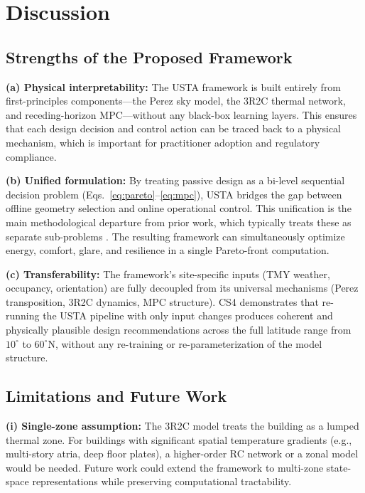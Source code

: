 \documentclass[5p,times,twocolumn]{elsarticle}
\begin{document}
\section{Discussion}
\label{sec:discussion}

\subsection{Strengths of the Proposed Framework}

\textbf{(a) Physical interpretability:} The USTA framework is built entirely from first-principles components---the Perez sky model, the 3R2C thermal network, and receding-horizon MPC---without any black-box learning layers. This ensures that each design decision and control action can be traced back to a physical mechanism, which is important for practitioner adoption and regulatory compliance.

\textbf{(b) Unified formulation:} By treating passive design as a bi-level sequential decision problem (Eqs.~\eqref{eq:pareto}--\eqref{eq:mpc}), USTA bridges the gap between offline geometry selection and online operational control. This unification is the main methodological departure from prior work, which typically treats these as separate sub-problems \cite{kirimtat2016,drgona2020}. The resulting framework can simultaneously optimize energy, comfort, glare, and resilience in a single Pareto-front computation.

\textbf{(c) Transferability:} The framework's site-specific inputs (TMY weather, occupancy, orientation) are fully decoupled from its universal mechanisms (Perez transposition, 3R2C dynamics, MPC structure). CS4 demonstrates that re-running the USTA pipeline with only input changes produces coherent and physically plausible design recommendations across the full latitude range from $10^\circ$ to $60^\circ$N, without any re-training or re-parameterization of the model structure.

\subsection{Limitations and Future Work}

\textbf{(i) Single-zone assumption:} The 3R2C model treats the building as a lumped thermal zone. For buildings with significant spatial temperature gradients (e.g., multi-story atria, deep floor plates), a higher-order RC network or a zonal model would be needed. Future work could extend the framework to multi-zone state-space representations while preserving computational tractability.
\end{document}

